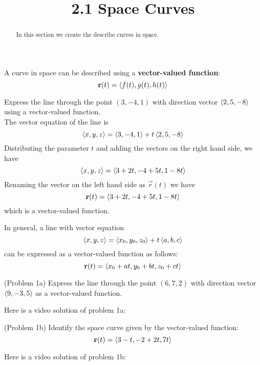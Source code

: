 \documentclass[handout]{ximera}
\title{2.1 Space Curves}
\begin{document}
\begin{abstract}
In this section we create the describe curves in space.
\end{abstract}

\maketitle


A curve in space can be described using a \textbf{vector-valued function}:
\[
\mathbf r(t) = \left\langle f(t), g(t), h(t)\right\rangle
\]

\begin{example}[Example 1]
Express the line through the point $(3, -4, 1)$ with direction vector $\left\langle 2, 5, -8\right\rangle$ using a vector-valued function.\\
The vector equation of the line is 
\[
\left\langle x, y, z\right\rangle = \left\langle 3, -4, 1\right\rangle + t\left\langle 2, 5, -8\right\rangle
\]
Distributing the parameter $t$ and adding the vectors on the right hand side, we have
\[
\left\langle x, y, z\right\rangle = \left\langle 3+2t,-4+ 5t, 1-8t\right\rangle
\]
Renaming the vector on the left hand side as $\vec r(t)$ we have
\[
\mathbf r(t) = \left\langle 3+2t,-4+ 5t, 1-8t\right\rangle
\]
which is a vector-valued function.

\end{example}

\begin{remark}

In general, a line with vector equation
\[
\left\langle x, y, z\right\rangle = \left\langle x_0, y_0, z_0\right\rangle + t\left\langle a, b, c\right\rangle
\]
can be expressed as a vector-valued function as follows:
\[
\mathbf r(t) = \left\langle x_0 + at, y_0 + bt, z_0 + ct\right\rangle
\]
\end{remark}

\begin{problem}(Problem 1a)
Express the line through the point $(6, 7, 2)$ with direction vector $\left\langle 9, -3, 5\right\rangle$ as a vector-valued function.
\end{problem}

Here is a video solution of problem 1a:\\
\begin{foldable}
\end{foldable}

\begin{problem}(Problem 1b)
Identify the space curve given by the vector-valued function:
\[
\mathbf r(t) = \left\langle 3 -t, -2 + 2t, 7t\right\rangle
\]
\end{problem}  
Here is a video solution of problem 1b:\\
\begin{foldable}
\end{foldable}
\end{document}
